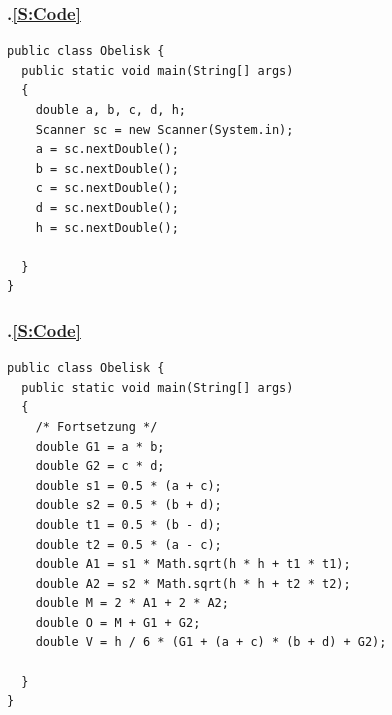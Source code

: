 \begin{frame}[fragile]%
    \frametitle{\kap.\ref{S:Code} \stitle}%

\begin{lstlisting}[style=java, title={Lese Seitenlängen und Höhe ein.}]
public class Obelisk {
  public static void main(String[] args)
  {
    double a, b, c, d, h;
    Scanner sc = new Scanner(System.in);
    a = sc.nextDouble();
    b = sc.nextDouble();
    c = sc.nextDouble();
    d = sc.nextDouble();
    h = sc.nextDouble();

  }
}
\end{lstlisting}
\end{frame}


\begin{frame}[fragile]%
    \frametitle{\kap.\ref{S:Code} \stitle}%

\begin{lstlisting}[style=java,frame=t, title={Berechne Hilfsvariablen.}]
public class Obelisk {
  public static void main(String[] args)
  {
    /* Fortsetzung */
    double G1 = a * b;
    double G2 = c * d;
    double s1 = 0.5 * (a + c);
    double s2 = 0.5 * (b + d);
    double t1 = 0.5 * (b - d);
    double t2 = 0.5 * (a - c);
    double A1 = s1 * Math.sqrt(h * h + t1 * t1);
    double A2 = s2 * Math.sqrt(h * h + t2 * t2);
    double M = 2 * A1 + 2 * A2;
    double O = M + G1 + G2;
    double V = h / 6 * (G1 + (a + c) * (b + d) + G2);

  }
}
\end{lstlisting}
\end{frame}